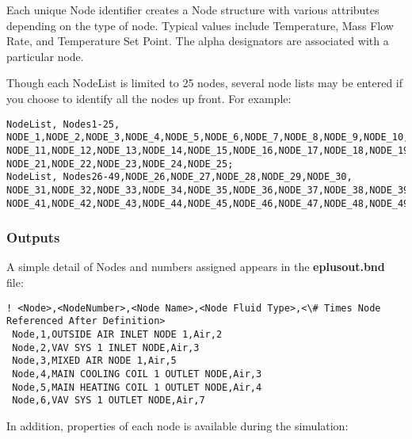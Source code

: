 Each unique Node identifier creates a Node structure with various attributes depending on the type of node. Typical values include Temperature, Mass Flow Rate, and Temperature Set Point. The alpha designators are associated with a particular node.

Though each NodeList is limited to 25 nodes, several node lists may be entered if you choose to identify all the nodes up front. For example:

\begin{lstlisting}
NodeList, Nodes1-25,
NODE_1,NODE_2,NODE_3,NODE_4,NODE_5,NODE_6,NODE_7,NODE_8,NODE_9,NODE_10,
NODE_11,NODE_12,NODE_13,NODE_14,NODE_15,NODE_16,NODE_17,NODE_18,NODE_19,NODE_20,
NODE_21,NODE_22,NODE_23,NODE_24,NODE_25;
NodeList, Nodes26-49,NODE_26,NODE_27,NODE_28,NODE_29,NODE_30,
NODE_31,NODE_32,NODE_33,NODE_34,NODE_35,NODE_36,NODE_37,NODE_38,NODE_39,NODE_40,
NODE_41,NODE_42,NODE_43,NODE_44,NODE_45,NODE_46,NODE_47,NODE_48,NODE_49;
\end{lstlisting}

\subsubsection{Outputs}\label{outputs-019}

A simple detail of Nodes and numbers assigned appears in the \textbf{eplusout.bnd} file:

\begin{lstlisting}
! <Node>,<NodeNumber>,<Node Name>,<Node Fluid Type>,<\# Times Node Referenced After Definition>
 Node,1,OUTSIDE AIR INLET NODE 1,Air,2
 Node,2,VAV SYS 1 INLET NODE,Air,3
 Node,3,MIXED AIR NODE 1,Air,5
 Node,4,MAIN COOLING COIL 1 OUTLET NODE,Air,3
 Node,5,MAIN HEATING COIL 1 OUTLET NODE,Air,4
 Node,6,VAV SYS 1 OUTLET NODE,Air,7
\end{lstlisting}

In addition, properties of each node is available during the simulation:

